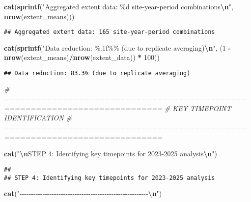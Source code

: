 \documentclass[
]{article}
\newenvironment{Shaded}{\begin{snugshade}}{\end{snugshade}}
\newcommand{\CommentTok}[1]{\textcolor[rgb]{0.56,0.35,0.01}{\textit{#1}}}
\newcommand{\DecValTok}[1]{\textcolor[rgb]{0.00,0.00,0.81}{#1}}
\newcommand{\FunctionTok}[1]{\textcolor[rgb]{0.13,0.29,0.53}{\textbf{#1}}}
\newcommand{\NormalTok}[1]{#1}
\newcommand{\SpecialCharTok}[1]{\textcolor[rgb]{0.81,0.36,0.00}{\textbf{#1}}}
\newcommand{\StringTok}[1]{\textcolor[rgb]{0.31,0.60,0.02}{#1}}
\begin{document}
\begin{Shaded}
\begin{Highlighting}[]
\FunctionTok{cat}\NormalTok{(}\FunctionTok{sprintf}\NormalTok{(}\StringTok{"Aggregated extent data: \%d site{-}year{-}period combinations}\SpecialCharTok{\textbackslash{}n}\StringTok{"}\NormalTok{, }\FunctionTok{nrow}\NormalTok{(extent\_means)))}
\end{Highlighting}
\end{Shaded}

\begin{verbatim}
## Aggregated extent data: 165 site-year-period combinations
\end{verbatim}

\begin{Shaded}
\begin{Highlighting}[]
\FunctionTok{cat}\NormalTok{(}\FunctionTok{sprintf}\NormalTok{(}\StringTok{"Data reduction: \%.1f\%\% (due to replicate averaging)}\SpecialCharTok{\textbackslash{}n}\StringTok{"}\NormalTok{, }
\NormalTok{            (}\DecValTok{1} \SpecialCharTok{{-}} \FunctionTok{nrow}\NormalTok{(extent\_means)}\SpecialCharTok{/}\FunctionTok{nrow}\NormalTok{(extent\_data)) }\SpecialCharTok{*} \DecValTok{100}\NormalTok{))}
\end{Highlighting}
\end{Shaded}

\begin{verbatim}
## Data reduction: 83.3% (due to replicate averaging)
\end{verbatim}

\begin{Shaded}
\begin{Highlighting}[]
\CommentTok{\# ============================================================================}
\CommentTok{\# KEY TIMEPOINT IDENTIFICATION}
\CommentTok{\# ============================================================================}

\FunctionTok{cat}\NormalTok{(}\StringTok{"}\SpecialCharTok{\textbackslash{}n}\StringTok{STEP 4: Identifying key timepoints for 2023{-}2025 analysis}\SpecialCharTok{\textbackslash{}n}\StringTok{"}\NormalTok{)}
\end{Highlighting}
\end{Shaded}

\begin{verbatim}
## 
## STEP 4: Identifying key timepoints for 2023-2025 analysis
\end{verbatim}

\begin{Shaded}
\begin{Highlighting}[]
\FunctionTok{cat}\NormalTok{(}\StringTok{"{-}{-}{-}{-}{-}{-}{-}{-}{-}{-}{-}{-}{-}{-}{-}{-}{-}{-}{-}{-}{-}{-}{-}{-}{-}{-}{-}{-}{-}{-}{-}{-}{-}{-}{-}{-}{-}{-}{-}{-}{-}{-}{-}{-}{-}{-}{-}{-}{-}{-}{-}{-}{-}{-}{-}{-}}\SpecialCharTok{\textbackslash{}n}\StringTok{"}\NormalTok{)}
\end{Highlighting}
\end{Shaded}
\end{document}
